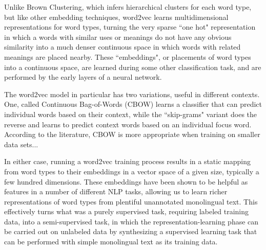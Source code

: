 Unlike Brown Clustering, which infers hierarchical clusters for each word type,
but like other embedding techniques, word2vec learns multidimensional
representations for word types, turning the very sparse ``one hot"
representation in which a words with similar uses or meanings do not have any
obvious similarity into a much denser continuous space in which words with
related meanings are placed nearby. These ``embeddings", or placements of word
types into a continuous space, are learned during some other classification
task, and are performed by the early layers of a neural network.

The word2vec model in particular has two variations, useful in different
contexts. One, called Continuous Bag-of-Words (CBOW) learns a classifier that
can predict individual words based on their context, while the ``skip-grams"
variant does the reverse and learns to predict context words based on an
individual focus word. According to the literature, CBOW is more appropriate
when training on smaller data sets...

In either case, running a word2vec training process results in a static mapping
from word types to their embeddings in a vector space of a given size,
typically a few hundred dimensions. These embeddings have been shown to be
helpful as features in a number of different NLP tasks, allowing us to learn
richer representations of word types from plentiful unannotated monolingual
text. This effectively turns what was a purely supervised task, requiring
labeled training data, into a semi-supervised task, in which the
representation-learning phase can be carried out on unlabeled data by
synthesizing a supervised learning task that can be performed with simple
monolingual text as its training data.

